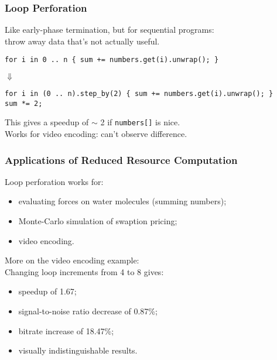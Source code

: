 
\begin{frame}[fragile]
  \frametitle{Loop Perforation}


  Like early-phase termination, but for sequential programs:\\
  \qquad throw away data that's not actually useful.

  \begin{lstlisting}
for i in 0 .. n { sum += numbers.get(i).unwrap(); }
  \end{lstlisting}

  \begin{center}
    $\Downarrow$
  \end{center}

  \begin{lstlisting}
for i in (0 .. n).step_by(2) { sum += numbers.get(i).unwrap(); }
sum *= 2;
  \end{lstlisting}

  This gives a speedup of $\sim$ 2 if {\tt numbers[]} is nice.\\[1em]

  Works for video encoding: can't observe difference.



\end{frame}

\begin{frame}
  \frametitle{Applications of Reduced Resource Computation}


  Loop perforation works for:
  \begin{itemize}
   \item evaluating forces on water molecules (summing numbers);
   \item Monte-Carlo simulation of swaption pricing;
   \item video encoding.
  \end{itemize}

  More on the video encoding example:\\
  Changing loop increments from 4 to 8 gives:
\begin{itemize}
 \item speedup of 1.67;
 \item signal-to-noise ratio decrease of 0.87\%;
 \item bitrate increase of 18.47\%;
 \item visually indistinguishable results.
\end{itemize}

\end{frame}






